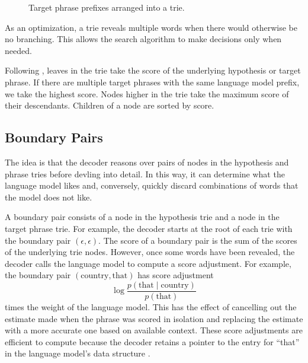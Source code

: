\documentclass[11pt]{article}
\begin{document}
\begin{figure}\centering
{}
\caption{\label{tgtpre}Target phrase prefixes arranged into a trie.}
\end{figure}

As an optimization, a trie reveals multiple words when there would otherwise be no branching.  This allows the search algorithm to make decisions only when needed.  

Following , leaves in the trie take the score of the underlying hypothesis or target phrase.  If there are multiple target phrases with the same language model prefix, we take the highest score.  Nodes higher in the trie take the maximum score of their descendants.   Children of a node are sorted by score.   

\subsection{Boundary Pairs}
The idea is that the decoder reasons over pairs of nodes in the hypothesis and phrase tries before devling into detail.  In this way, it can determine what the language model likes and, conversely, quickly discard combinations of words that the model does not like.  

A boundary pair consists of a node in the hypothesis trie and a node in the target phrase trie.  For example, the decoder starts at the root of each trie with the boundary pair $(\epsilon, \epsilon)$.  The score of a boundary pair is the sum of the scores of the underlying trie nodes.  However, once some words have been revealed, the decoder calls the language model to compute a score adjustment.  For example, the boundary pair $(\text{country}, \text{that})$ has score adjustment
\[\log \frac{p(\text{that}\mid\text{country})}{p(\text{that})} \]
times the weight of the language model.  This has the effect of cancelling out the estimate made when the phrase was scored in isolation and replacing the estimate with a more accurate one based on available context.  These score adjustments are efficient to compute because the decoder retains a pointer to the entry for ``that'' in the language model's data structure \cite{iwslt}. 
\end{document}

